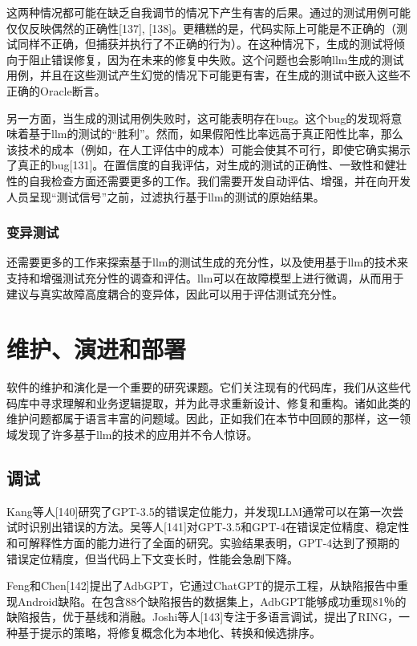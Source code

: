 \begin{translation}
这两种情况都可能在缺乏自我调节的情况下产生有害的后果。通过的测试用例可能仅仅反映偶然的正确性[137], [138]。更糟糕的是，代码实际上可能是不正确的（测试同样不正确，但捕获并执行了不正确的行为）。在这种情况下，生成的测试将倾向于阻止错误修复，因为在未来的修复中失败。这个问题也会影响llm生成的测试用例，并且在这些测试产生幻觉的情况下可能更有害，在生成的测试中嵌入这些不正确的Oracle断言。

另一方面，当生成的测试用例失败时，这可能表明存在bug。这个bug的发现将意味着基于llm的测试的“胜利”。然而，如果假阳性比率远高于真正阳性比率，那么该技术的成本（例如，在人工评估中的成本）可能会使其不可行，即使它确实揭示了真正的bug[131]。在置信度的自我评估，对生成的测试的正确性、一致性和健壮性的自我检查方面还需要更多的工作。我们需要开发自动评估、增强，并在向开发人员呈现“测试信号”之前，过滤执行基于llm的测试的原始结果。

\subsubsection{变异测试}

还需要更多的工作来探索基于llm的测试生成的充分性，以及使用基于llm的技术来支持和增强测试充分性的调查和评估。llm可以在故障模型上进行微调，从而用于建议与真实故障高度耦合的变异体，因此可以用于评估测试充分性。

\section{维护、演进和部署}

软件的维护和演化是一个重要的研究课题。它们关注现有的代码库，我们从这些代码库中寻求理解和业务逻辑提取，并为此寻求重新设计、修复和重构。诸如此类的维护问题都属于语言丰富的问题域。因此，正如我们在本节中回顾的那样，这一领域发现了许多基于llm的技术的应用并不令人惊讶。

\subsection{调试}

Kang等人[140]研究了GPT-3.5的错误定位能力，并发现LLM通常可以在第一次尝试时识别出错误的方法。吴等人[141]对GPT-3.5和GPT-4在错误定位精度、稳定性和可解释性方面的能力进行了全面的研究。实验结果表明，GPT-4达到了预期的错误定位精度，但当代码上下文变长时，性能会急剧下降。

Feng和Chen[142]提出了AdbGPT，它通过ChatGPT的提示工程，从缺陷报告中重现Android缺陷。在包含88个缺陷报告的数据集上，AdbGPT能够成功重现81％的缺陷报告，优于基线和消融。Joshi等人[143]专注于多语言调试，提出了RING，一种基于提示的策略，将修复概念化为本地化、转换和候选排序。


\end{translation}
